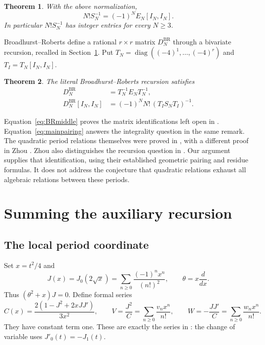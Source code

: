 \documentclass[11pt]{article}
\newtheorem{theorem}{Theorem}[section]
\theoremstyle{definition}
\newcommand{\diag}{\operatorname{diag}}
\newcommand{\BR}{\mathrm{BR}}
\numberwithin{equation}{section}
\begin{document}
\begin{theorem}\label{thm:pairing}
With the above normalization,
\begin{equation}\label{eq:mainpairing}
 N!S_N^{-1}=(-1)^NE_N[I_N,I_N].
\end{equation}
In particular $N!S_N^{-1}$ has integer entries for every $N\ge3$.
\end{theorem}

Broadhurst--Roberts \cite[formulas (5.7)--(5.12)]{BR} define a rational
$r\times r$ matrix $D_N^{\BR}$ through a bivariate recursion, recalled
in Section~\ref{sec:series}. Put
$T_N=\diag((-4)^1,\ldots,(-4)^r)$ and $T_I=T_N[I_N,I_N]$.

\begin{theorem}\label{thm:BR}
The literal Broadhurst--Roberts recursion satisfies
\begin{align}
 D_N^{\BR}&=T_N^{-1}E_NT_N^{-1},\label{eq:BRfull}\\
 D_N^{\BR}[I_N,I_N]
   &=(-1)^NN!\,(T_IS_NT_I)^{-1}.\label{eq:BRmiddle}
\end{align}
\end{theorem}

Equation~\eqref{eq:BRmiddle} proves the matrix identifications left
open in \cite[Remark 5.12]{FSY}. Equation~\eqref{eq:mainpairing}
answers the integrality question in the same remark.
The quadratic period relations themselves were proved in \cite{FSY},
with a different proof in Zhou \cite{Zhou}. Zhou also distinguishes
the recursion question in \cite[Section 4.3]{Zhou}.
Our argument supplies that identification, using their established
geometric pairing and residue formulas. It does not address the
conjecture that quadratic relations exhaust all algebraic relations
between these periods.

\section{Summing the auxiliary recursion}\label{sec:series}

\subsection{The local period coordinate}
Set $x=t^2/4$ and
\[
 J(x)=J_0(2\sqrt x)=\sum_{n\ge0}\frac{(-1)^nx^n}{(n!)^2},\qquad
 \theta=x\frac d{dx}.
\]
Thus $(\theta^2+x)J=0$. Define formal series
\begin{equation}\label{eq:CVW}
 C(x)=\frac{2(1-J^2+2xJJ')}{3x^2},\qquad
 V=\frac{J^2}{C}=\sum_{n\ge0}\frac{v_nx^n}{n!},\qquad
 W=-\frac{JJ'}{C}=\sum_{n\ge0}\frac{w_nx^n}{n!}.
\end{equation}
They have constant term one. These are exactly the series in
\cite[formulas (5.7)--(5.9)]{BR}: the change of variable uses
$J'_0(t)=-J_1(t)$.
\end{document}
